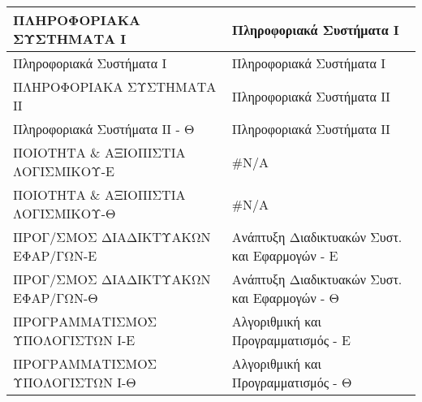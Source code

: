\documentclass[12pt,a4paper,final]{article}
\begin{document}
\begin{landscape}
\begin{center}
\begin{longtable}{|l|l|}
\hline
ΠΛΗΡΟΦΟΡΙΑΚΑ ΣΥΣΤΗΜΑΤΑ Ι                                                                                        & Πληροφοριακά Συστήματα Ι                                                                                             \\ 
\hline
Πληροφοριακά Συστήματα Ι                                                                                        & Πληροφοριακά Συστήματα Ι                                                                                             \\ 
\hline
ΠΛΗΡΟΦΟΡΙΑΚΑ ΣΥΣΤΗΜΑΤΑ ΙΙ                                                                                       & Πληροφοριακά Συστήματα ΙΙ                                                                                            \\ 
\hline
Πληροφοριακά Συστήματα ΙΙ - Θ                                                                                   & Πληροφοριακά Συστήματα ΙΙ                                                                                            \\ 
\hline
ΠΟΙΟΤΗΤΑ \& ΑΞΙΟΠΙΣΤΙΑ ΛΟΓΙΣΜΙΚΟΥ-Ε                                                                             & \#N/A                                                                                                                \\ 
\hline
ΠΟΙΟΤΗΤΑ \& ΑΞΙΟΠΙΣΤΙΑ ΛΟΓΙΣΜΙΚΟΥ-Θ                                                                             & \#N/A                                                                                                                \\ 
\hline
ΠΡΟΓ/ΣΜΟΣ ΔΙΑΔΙΚΤΥΑΚΩΝ ΕΦΑΡ/ΓΩΝ-Ε                                                                               & Ανάπτυξη Διαδικτυακών Συστ. και Εφαρμογών - Ε                                                                        \\ 
\hline
ΠΡΟΓ/ΣΜΟΣ ΔΙΑΔΙΚΤΥΑΚΩΝ ΕΦΑΡ/ΓΩΝ-Θ                                                                               & Ανάπτυξη Διαδικτυακών Συστ. και Εφαρμογών - Θ                                                                        \\ 
\hline
ΠΡΟΓΡΑΜΜΑΤΙΣΜΟΣ ΥΠΟΛΟΓΙΣΤΩΝ Ι-Ε                                                                                 & Αλγοριθμική και Προγραμματισμός - Ε                                                                                  \\ 
\hline
ΠΡΟΓΡΑΜΜΑΤΙΣΜΟΣ ΥΠΟΛΟΓΙΣΤΩΝ Ι-Θ                                                                                 & Αλγοριθμική και Προγραμματισμός - Θ                                                                                  \\ 

\end{longtable}
\end{center}
\end{landscape}
\end{document}
